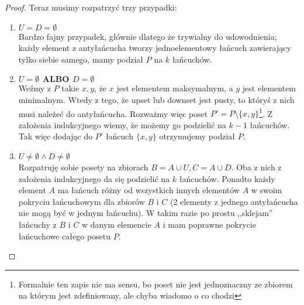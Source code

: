 \begin{proof}
        Teraz musimy rozpatrzyć trzy przypadki:
        \begin{enumerate}
            \item $U = D = \emptyset$ \\
            Bardzo fajny przypadek, głównie dlatego że trywialny do udowodnienia; każdy element z antyłańcucha tworzy jednoelementowy łańcuch zawierający tylko siebie samego, mamy podział $P$ na $k$ łańcuchów.
            \item $U = \emptyset \hspace{5pt} \mathbf{ALBO} \hspace{5pt} D = \emptyset$ \\
            Weźmy z \(P\) takie \(x, y\), że \(x\) jest elementem maksymalnym, a \(y\) jest elementem minimalnym. Wtedy z tego, że upset lub downset jest pusty, to któryś z nich musi należeć do antyłańcucha. Rozważmy więc poset \(P' = P\setminus \{x,y \}\)\footnote{Formalnie ten zapis nie ma sensu, bo poset nie jest jednoznaczny ze zbiorem na którym jest zdefiniowany, ale chyba wiadomo o co chodzi}. Z założenia indukcyjnego wiemy, że możemy go podzielić na \(k - 1 \) łańcuchów. Tak więc dodając do \(P'\) łańcuch \( \{x, y\} \) otrzymujemy podział \(P\).
            \item $U \not = \emptyset \wedge D \not = \emptyset$ \\
            Rozpatruję sobie posety na zbiorach $B = A \cup U, C = A \cup D$. Oba z nich z założenia indukcyjnego da się podzielić na $k$ łańcuchów. Ponadto każdy element $A$ ma łańcuch różny od wszystkich innych elementów $A$ w swoim pokryciu łańcuchowym dla zbiorów $B$ i $C$ (2 elementy z jednego antyłańcucha nie mogą być w jednym łańcuchu). W takim razie po prostu ,,sklejam'' łańcuchy z $B$ i $C$ w danym elemencie $A$ i mam poprawne pokrycie łańcuchowe całego posetu $P$.
            
    \end{enumerate}
        
     \end{proof}